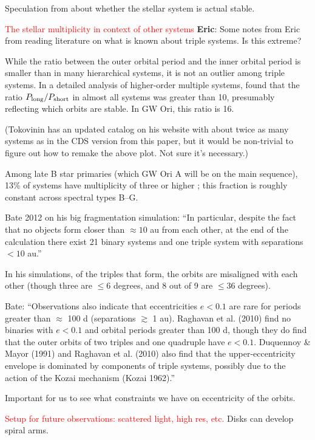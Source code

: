 \documentclass[twocolumn]{aastex61}
\newcommand{\todo}[1]{ \textcolor{red}{#1}}
\begin{document}
Speculation from \citet{berger11} about whether the stellar system is actual stable.


\todo{The stellar multiplicity in context of other systems}
\textbf{Eric}: Some notes from Eric from reading literature on what is known about triple systems.  Is this extreme?

While the ratio between the outer orbital period and the inner orbital period is smaller than in many hierarchical systems, it is not an outlier among triple systems.  In a detailed analysis of higher-order multiple systems, \citet{tokovinin97} found that the ratio $P_\mathrm{long} / P_{\rm short}$ in almost all systems was greater than 10, presumably reflecting which orbits are stable.  In GW Ori, this ratio is 16.

(Tokovinin has an updated catalog on his website with about twice as many systems as in the CDS version from this paper, but it would be non-trivial to figure out how to remake the above plot.  Not sure it's necessary.)

Among late B star primaries (which GW Ori A will be on the main sequence), 13\% of systems have multiplicity of three or higher \citep{eggleton08}; this fraction is roughly constant across spectral types B--G.


Bate 2012 on his big fragmentation simulation: ``In particular, despite the fact that no objects form closer than $\approx 10$ au from each other, at the end of the calculation there exist 21 binary systems and one triple system with separations $<10$ au.''

In his simulations, of the triples that form, the orbits are misaligned with each other (though three are $\leq 6$ degrees, and 8 out of 9 are $\leq 36$ degrees).

Bate:  ``Observations also indicate that eccentricities $e < 0.1$ are rare for periods greater than $\approx$ 100 d (separations $\gtrsim$ 1 au). Raghavan et al. (2010) find no binaries with $e < 0.1$ and orbital periods greater than 100 d, though they do find that the outer orbits of two triples and one quadruple have $e < 0.1$. Duquennoy \& Mayor (1991) and Raghavan et al. (2010) also find that the upper-eccentricity envelope is dominated by components of triple systems, possibly due to the action of the Kozai mechanism (Kozai 1962).''

Important for us to see what constraints we have on eccentricity of the orbits.


\todo{Setup for future observations: scattered light, high res, etc.}
Disks can develop spiral arms.
\end{document}
